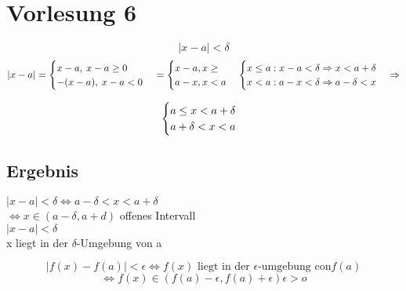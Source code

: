 \section{Vorlesung 6}
\[|x-a| < \delta \]
\begin{equation}
\\|x-a| = \begin{cases}
	x-a , \: x-a \geq 0  \\
	-(x-a),\:  x-a<0 \\
	\end{cases}
 = \begin{cases}
x-a , x \geq \\
a-x , x < a \\
\end{cases}	
 \begin{cases}
  x \leq a : x-a < \delta \Rightarrow x < a+\delta \\
  x<a : a-x < \delta \Rightarrow a-\delta < x	\end{cases} \Rightarrow 
\end{equation}


\begin{equation}
\\ \begin{cases}
a \leq x < a+\delta  \\
a+\delta < x < a \\
\end{cases}
\end{equation}
\subsection{Ergebnis}
$|x-a|<\delta \Leftrightarrow a-\delta < x < a+ \delta$ \\
$\Leftrightarrow x \in (a-\delta , a+d ) $ offenes Intervall \\
$|x-a| < \delta$ \\

 
 x liegt in der $\delta $-Umgebung von a
	
\[	|f(x) -f(a)| < \epsilon  \Leftrightarrow f(x)\text{ liegt in der }\epsilon\text{-umgebung con} f(a)
							 \] \[\Leftrightarrow f(x) \in \left( f(a)-\epsilon , f(a)+ \epsilon \right) \epsilon > o	 \]
 
 
